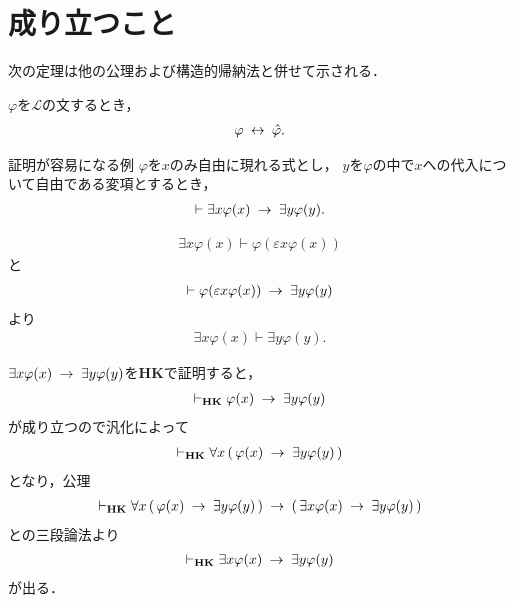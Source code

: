 \section{成り立つこと}
	次の定理は他の公理および構造的帰納法と併せて示される．
	
	\begin{screen}
		\begin{thm}[書き換えの同値性]
			$\varphi$を$\mathcal{L}$の文するとき，
			\begin{align}
				\varphi \hspace{0.25em}\leftrightarrow\hspace{0.25em} \hat{\varphi}.
			\end{align}
		\end{thm}
	\end{screen}

\newpage
	\begin{itembox}[l]{証明が容易になる例}
		$\varphi$を$x$のみ自由に現れる式とし，
		$y$を$\varphi$の中で$x$への代入について自由である変項とするとき，
		\begin{align}
			\vdash \exists x \varphi(x) \hspace{0.25em}\rightarrow\hspace{0.25em} \exists y \varphi(y).
		\end{align}
	\end{itembox}
	
	\begin{sketch}
		\begin{align}
			\exists x \varphi(x) \vdash \varphi(\varepsilon x \varphi(x))
		\end{align}
		と
		\begin{align}
			\vdash \varphi(\varepsilon x \varphi(x))
			\hspace{0.25em}\rightarrow\hspace{0.25em} \exists y \varphi(y)
		\end{align}
		より
		\begin{align}
			\exists x \varphi(x) \vdash \exists y \varphi(y).
		\end{align}
	\end{sketch}

\newpage
	$\exists x \varphi(x) \hspace{0.25em}\rightarrow\hspace{0.25em} \exists y \varphi(y)$を{\bf HK}で証明すると，
	\begin{align}
		\vdash_{{\scriptsize \mbox{{\bf HK}}}} \varphi(x) \hspace{0.25em}\rightarrow\hspace{0.25em} \exists y \varphi(y)
	\end{align}
	が成り立つので汎化によって
	\begin{align}
		\vdash_{{\scriptsize \mbox{{\bf HK}}}} \forall x\, (\, \varphi(x) \hspace{0.25em}\rightarrow\hspace{0.25em} \exists y \varphi(y)\, )
	\end{align}
	となり，公理
	\begin{align}
		\vdash_{{\scriptsize \mbox{{\bf HK}}}} \forall x\, (\, \varphi(x) \hspace{0.25em}\rightarrow\hspace{0.25em} \exists y \varphi(y)\, )
		\hspace{0.25em}\rightarrow\hspace{0.25em} (\, \exists x \varphi(x) \hspace{0.25em}\rightarrow\hspace{0.25em} \exists y \varphi(y)\, )
	\end{align}
	との三段論法より
	\begin{align}
		\vdash_{{\scriptsize \mbox{{\bf HK}}}} \exists x \varphi(x) \hspace{0.25em}\rightarrow\hspace{0.25em} \exists y \varphi(y)
	\end{align}
	が出る．

